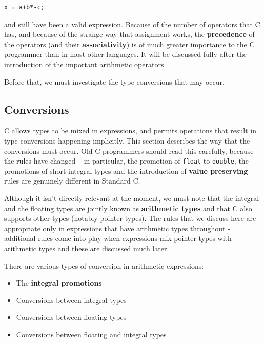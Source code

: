   \begin{Verbatim}
x = a+b*-c;
\end{Verbatim}

  and still have been a valid expression. Because of the number of
   operators that C has, and because of the strange way that assignment works,
   the \textbf{precedence} of the operators (and their
   \textbf{associativity}) is of much greater importance to the
   C programmer than in most other languages. It will be discussed fully
   after the introduction of the important arithmetic operators.


  Before that, we must investigate the type conversions that may occur.


  \subsection{Conversions}
   

   C allows types to be mixed in expressions, and permits operations that
    result in type conversions happening implicitly. This section describes
    the way that the conversions must occur. Old C programmers should read
    this carefully, because the rules have changed -- in particular, the
    promotion of \texttt{float} to \texttt{double}, the promotions of
    short integral types and the introduction of \textbf{value preserving}
    rules are genuinely different in Standard C.


   Although it isn't directly relevant at the moment, we must note that the
    integral and the floating types are jointly known as \textbf{arithmetic
    types} and that C also supports other types (notably pointer types).
    The rules that we discuss here are appropriate only in expressions that
    have arithmetic types throughout - additional rules come into play when
    expressions mix pointer types with arithmetic types and these are
    discussed much later.


   There are various types of conversion in arithmetic expressions:


   \begin{itemize}
    \item The \textbf{integral promotions}
    \item Conversions between integral types
    \item Conversions between floating types
    \item Conversions between floating and integral types
   \end{itemize}

